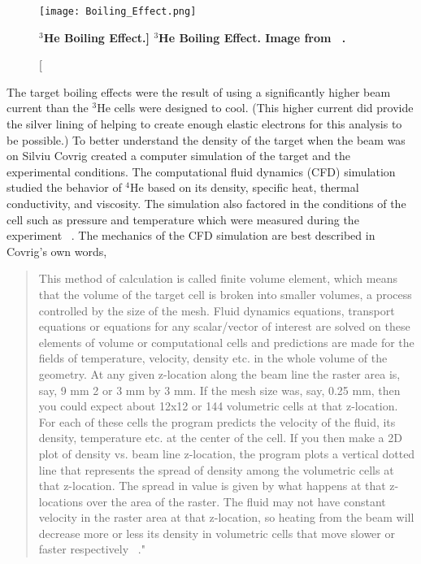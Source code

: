 \begin{figure}[!ht]
\begin{center}
\texttt{[image: Boiling\_Effect.png]}
\end{center}
\caption[\bf{$^3$He Boiling Effect.}]{
{\bf{$^3$He Boiling Effect.}} Image from ~\cite{Thesis:Ye}.}
\label{fig:boiling_effect}
\end{figure}

The target boiling effects were the result of using a significantly higher beam current than the $^3$He cells were designed to cool. (This higher current did provide the silver lining of helping to create enough elastic electrons for this analysis to be possible.) To better understand the density of the target when the beam was on Silviu Covrig created a computer simulation of the target and the experimental conditions. The computational fluid dynamics (CFD) simulation studied the behavior of $^4$He based on its density, specific heat, thermal conductivity, and viscosity. The simulation also factored in the conditions of the cell such as pressure and temperature which were measured during the experiment ~\cite{density}. The mechanics of the CFD simulation are best described in Covrig's own words, 

\begin{quote}
This method of calculation is called finite volume element, which means that the volume of the target cell is broken into smaller volumes, a process controlled by the size of the mesh. Fluid dynamics equations, transport equations or equations for any scalar/vector of interest are solved on these elements of volume or computational cells and predictions are made for the fields of temperature, velocity, density etc. in the whole volume of the geometry. At any given z-location along the beam line the raster area is, say, 9 mm 2 or 3 mm by 3 mm. If the mesh size was, say, 0.25 mm, then you could expect about 12x12 or 144 volumetric cells at that z-location. For each of these cells the program predicts the velocity of the fluid, its density, temperature etc. at the center of the cell. If you then make a 2D plot of density vs. beam line z-location, the program plots a vertical dotted line that represents the spread of density among the volumetric cells at that z-location. The spread in value is given by what happens at that z-locations over the area of the raster. The fluid may not have constant velocity in the raster area at that z-location, so heating from the beam will decrease more or less its density in volumetric cells that move slower or faster respectively ~\cite{density}."
\end{quote}

